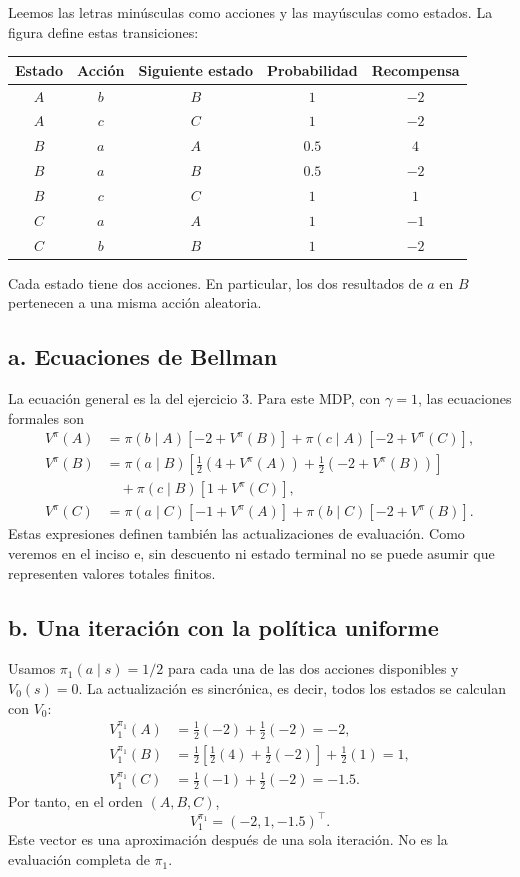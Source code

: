 \documentclass[11pt,a4paper]{article}
\newcommand{\apartado}[1]{\subsection*{#1}}
\begin{document}
Leemos las letras minúsculas como acciones y las mayúsculas como estados. La figura define estas transiciones:
\begin{center}
\begin{tabular}{ccccc}
\toprule
Estado & Acción & Siguiente estado & Probabilidad & Recompensa\\
\midrule
$A$ & $b$ & $B$ & $1$ & $-2$\\
$A$ & $c$ & $C$ & $1$ & $-2$\\
$B$ & $a$ & $A$ & $0.5$ & $4$\\
$B$ & $a$ & $B$ & $0.5$ & $-2$\\
$B$ & $c$ & $C$ & $1$ & $1$\\
$C$ & $a$ & $A$ & $1$ & $-1$\\
$C$ & $b$ & $B$ & $1$ & $-2$\\
\bottomrule
\end{tabular}
\end{center}
Cada estado tiene dos acciones. En particular, los dos resultados de $a$ en $B$ pertenecen a una misma acción aleatoria.

\apartado{a. Ecuaciones de Bellman}
La ecuación general es la del ejercicio 3. Para este MDP, con $\gamma=1$, las ecuaciones formales son
\begin{align*}
V^\pi(A)&=\pi(b\mid A)[-2+V^\pi(B)]+\pi(c\mid A)[-2+V^\pi(C)],\\
V^\pi(B)&=\pi(a\mid B)\left[\tfrac12(4+V^\pi(A))+\tfrac12(-2+V^\pi(B))\right]\\
&\quad+\pi(c\mid B)[1+V^\pi(C)],\\
V^\pi(C)&=\pi(a\mid C)[-1+V^\pi(A)]+\pi(b\mid C)[-2+V^\pi(B)].
\end{align*}
Estas expresiones definen también las actualizaciones de evaluación. Como veremos en el inciso e, sin descuento ni estado terminal no se puede asumir que representen valores totales finitos.

\apartado{b. Una iteración con la política uniforme}
Usamos $\pi_1(a\mid s)=1/2$ para cada una de las dos acciones disponibles y $V_0(s)=0$. La actualización es sincrónica, es decir, todos los estados se calculan con $V_0$:
\begin{align*}
V^{\pi_1}_1(A)&=\tfrac12(-2)+\tfrac12(-2)=-2,\\
V^{\pi_1}_1(B)&=\tfrac12\left[\tfrac12(4)+\tfrac12(-2)\right]+\tfrac12(1)=1,\\
V^{\pi_1}_1(C)&=\tfrac12(-1)+\tfrac12(-2)=-1.5.
\end{align*}
Por tanto, en el orden $(A,B,C)$,
\[
\boxed{V^{\pi_1}_1=(-2,1,-1.5)^\top.}
\]
Este vector es una aproximación después de una sola iteración. No es la evaluación completa de $\pi_1$.
\end{document}
